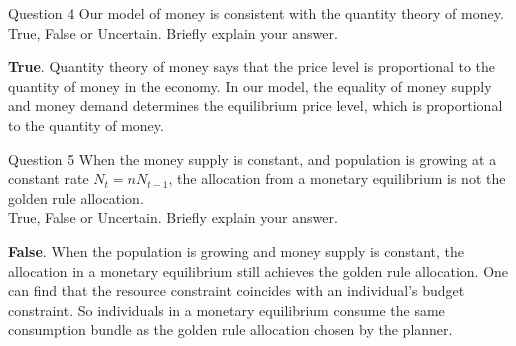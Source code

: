 \documentclass[a4paper]{article}
\newif\IfInSansMode
\numberwithin{equation}{section}
\numberwithin{figure}{section}
\begin{document}
	\begin{questionbox}{Question 4}
		Our model of money is consistent with the quantity theory of money.\\
		True, False or Uncertain. Briefly explain your answer.
		\begin{explanationbox}
			\textbf{True}. Quantity theory of money says that the price level is proportional to the quantity of money in the economy. In our model, the equality of money supply and money demand determines the equilibrium price level, which is proportional to the quantity of money.
		\end{explanationbox}
	\end{questionbox}
	\begin{questionbox}{Question 5}
		When the money supply is constant, and population is growing at a constant rate \( N_t = nN_{t-1} \), the allocation from a monetary equilibrium is not the golden rule allocation.\\
		True, False or Uncertain. Briefly explain your answer.
		\begin{explanationbox}
			\textbf{False}. When the population is growing and money supply is constant, the allocation in a monetary equilibrium still achieves the golden rule allocation. One can find that the resource constraint coincides with an individual's budget constraint. So individuals in a monetary equilibrium consume the same consumption bundle as the golden rule allocation chosen by the planner.
		\end{explanationbox}
	\end{questionbox}\pagebreak
\end{document}

